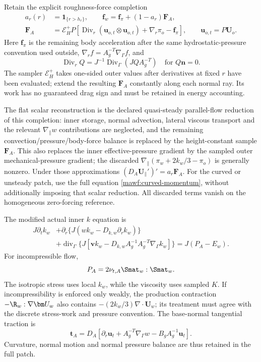 Retain the explicit roughness-force completion
\begin{equation}
 \begin{split}
 a_r(r)&=\mathbf1_{\{r>h_r\}},\qquad
 \bm f_w=\bm f_\pi+(1-a_r)\bm F_A,\\
 \bm F_A&=\mathcal E_H^+P
 \left[\operatorname{Div}_r(\bm u_{o,t}\otimes\bm u_{o,t})
             +\nabla_r\pi_o-\bm f_\pi\right],
 \qquad \bm u_{o,t}=P\bm U_o .
 \end{split}
 \label{mawf:rough-force}
\end{equation}
Here \(\bm f_\pi\) is the remaining body acceleration after the
same hydrostatic-pressure convention used outside,
\(\nabla_rf=A_g^{-T}\nabla_\Gamma f\), and
\[
 \operatorname{Div}_r Q
 =J^{-1}\operatorname{Div}_\Gamma(JQA_g^{-T})
 \quad\text{for }Q\bm n=0.
\]
The sampler \(\mathcal E_H^+\) takes one-sided outer values after
derivatives at fixed \(r\) have been evaluated; extend the resulting
\(\bm F_A\) constantly along each normal ray.
Its work has no guaranteed drag sign and must be retained in
energy accounting.

The flat scalar reconstruction is the declared quasi-steady
parallel-flow reduction of this completion: inner storage,
normal advection, lateral viscous transport and the relevant
\(\nabla_\parallel w\) contributions are neglected, and the
remaining convection/pressure/body-force balance is replaced
by the height-constant sample \(\bm F_A\).
This also replaces the inner effective-pressure gradient by the
sampled outer mechanical-pressure gradient; the discarded
\(\nabla_\parallel(\pi_w+2k_w/3-\pi_o)\) is generally nonzero.
Under those approximations
\((D_A\bm U_\parallel')'=a_r\bm F_A\).
For the curved or unsteady patch, use the full equation
\cref{mawf:curved-momentum}, without additionally imposing that
scalar reduction. All discarded terms vanish on the homogeneous
zero-forcing reference.

The modified actual inner \(k\) equation is
\begin{equation}
 \boxed{\begin{aligned}
 J\partial_t k_w
 &+\partial_r\{J(wk_w-D_{k,w}\partial_rk_w)\}\\
 &+\operatorname{div}_\Gamma
 \{J[\bm v k_w-D_{k,w}A_g^{-1}A_g^{-T}\nabla_\Gamma k_w]\}
 =J(P_A-E_w).
 \end{aligned}}
 \label{mawf:curved-k}
\end{equation}
For incompressible flow,
\[
 P_A=2\nu_{t,A}\Smat_w:\Smat_w .
\]
The isotropic stress uses local \(k_w\), while the viscosity
uses sampled \(K\). If incompressibility is enforced only weakly,
the production contraction \(-\R_w:\nabla\bm U_w\) also contains
\(-(2k_w/3)\nabla\cdot\bm U_w\); its treatment must agree with
the discrete stress-work and pressure convention.
The base-normal tangential traction is
\begin{equation}
 \bm t_A=D_A\left[
 \partial_r\bm u_t+A_g^{-T}\nabla_\Gamma w-B_gA_g^{-1}\bm u_t
 \right].
 \label{mawf:curved-traction}
\end{equation}
Curvature, normal motion and normal pressure balance are thus
retained in the full patch.

